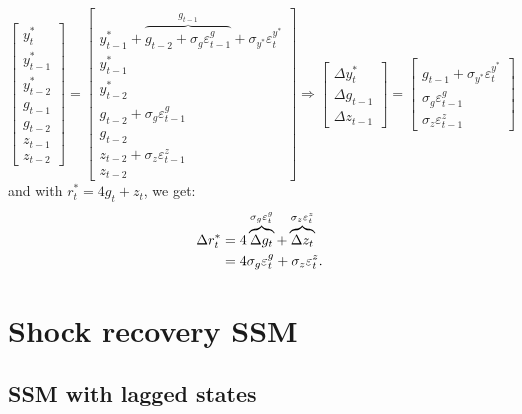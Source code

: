 \documentclass[a4paper,12pt]{article}
\newcommand{\vsp}[1]{\vspace*{#1mm}}\newcommand{\hsp}[1]{\hspace*{#1mm}}  }
\begin{document}
\begin{equation}
\begin{bmatrix}
y_{t}^{\ast } \\
y_{t-1}^{\ast } \\
y_{t-2}^{\ast } \\
g_{t-1} \\
g_{t-2} \\
z_{t-1} \\
z_{t-2}%
\end{bmatrix}%
=%
\begin{bmatrix}
y_{t-1}^{\ast }+\overbrace{g_{t-2}+\sigma _{g}\varepsilon _{t-1}^{g}}%
^{g_{t-1}}+\sigma _{y^{\ast }}\varepsilon _{t}^{y^{\ast }} \\
y_{t-1}^{\ast } \\
y_{t-2}^{\ast } \\
g_{t-2}+\sigma _{g}\varepsilon _{t-1}^{g} \\
g_{t-2} \\
z_{t-2}+\sigma _{z}\varepsilon _{t-1}^{z} \\
z_{t-2}%
\end{bmatrix}%
\Rightarrow
\begin{bmatrix}
\Delta y_{t}^{\ast } \\
\Delta g_{t-1} \\
\Delta z_{t-1}%
\end{bmatrix}%
=%
\begin{bmatrix}
g_{t-1}+\sigma _{y^{\ast }}\varepsilon _{t}^{y^{\ast }} \\
\sigma _{g}\varepsilon _{t-1}^{g} \\
\sigma _{z}\varepsilon _{t-1}^{z}%
\end{bmatrix}
\label{lwb}
\end{equation}%
and with $r_{t}^{\ast }=4g_{t}+z_{t}$, we get: \vsp{-4}
\begin{align}
\Delta r_{t}^{\ast }& =4\overbrace{\Delta g_{t}}^{\sigma _{g}\varepsilon
_{t}^{g}}+\overbrace{\Delta z_{t}}^{\sigma _{z}\varepsilon _{t}^{z}}  \notag
\\
& =4\sigma _{g}\varepsilon _{t}^{g}+\sigma _{z}\varepsilon _{t}^{z}.
\label{drstar}
\end{align}

\section{Shock recovery SSM}

\subsection{SSM with lagged states}
\end{document}
